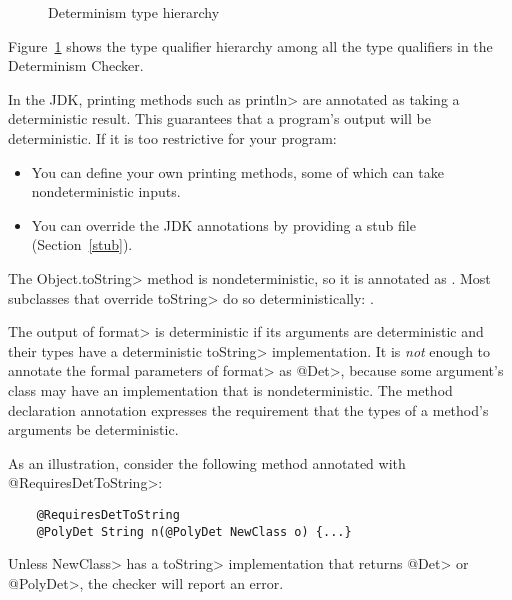 \begin{figure}
    \begin{center}
    \end{center}
    \caption{Determinism type hierarchy}
    \label{fig-determinism-all-hierarchy}
\end{figure}
Figure~\ref{fig-determinism-all-hierarchy} shows the type qualifier hierarchy among all the
type qualifiers in the Determinism Checker.


In the JDK, printing methods such as \<println> are annotated as taking a
deterministic result.  This guarantees that a program's output will be
deterministic.  If it is too restrictive for your program:
\begin{itemize}
\item
  You can define your own printing methods, some of which can take
  nondeterministic inputs.
\item
  You can override the JDK annotations by providing a stub file
  (Section~\ref{stub}).
\end{itemize}



The \<Object.toString> method is nondeterministic, so it is annotated as
.  Most subclasses
that override \<toString> do so deterministically:
.

The output of \<format> is deterministic if its arguments are
deterministic and their types have a deterministic \<toString> implementation.
It is \emph{not} enough to annotate the formal parameters of \<format> as
\<@Det>, because some argument's class may have an implementation that is nondeterministic.
The method declaration annotation
 expresses the
requirement that the types of a method's arguments be deterministic.

As an illustration, consider the following method annotated with \<@RequiresDetToString>:
\begin{Verbatim}
    @RequiresDetToString
    @PolyDet String n(@PolyDet NewClass o) {...}
\end{Verbatim}
Unless \<NewClass> has a \<toString> implementation that returns \<@Det> or \<@PolyDet>,
the checker will report an error.

